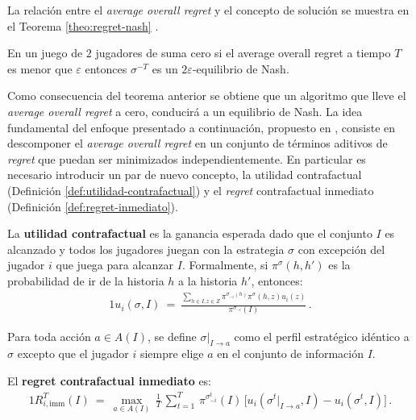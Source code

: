 La relación entre el \textit{average overall regret} y el concepto de solución se muestra en el Teorema \ref{theo:regret-nash} \cite{bib:cfr}.
\begin{theorem}
\label{theo:regret-nash}
En un juego de $2$ jugadores de suma cero si el average overall regret a tiempo $T$ es menor que $\varepsilon$ entonces $\sigma^{-T}$ es un $2\varepsilon$-equilibrio de Nash.
\end{theorem}

Como consecuencia del teorema anterior se obtiene que un algoritmo que lleve el \textit{average overall regret} a cero, conducirá a un equilibrio de Nash. La idea fundamental del enfoque presentado a continuación, propuesto en \cite{bib:cfr}, consiste en descomponer el \textit{average overall regret} en un conjunto de términos aditivos de \textit{regret} que puedan ser minimizados independientemente. En particular es necesario introducir un par de nuevo concepto, la utilidad contrafactual (Definición \ref{def:utilidad-contrafactual}) y el \textit{regret} contrafactual inmediato (Definición \ref{def:regret-inmediato}).

\begin{definition}
\label{def:utilidad-contrafactual}
La \textbf{utilidad contrafactual} es la ganancia esperada dado que el conjunto $I$ es alcanzado y todos los jugadores juegan con la estrategia $\sigma$ con excepción del jugador $i$ que juega para alcanzar $I$. Formalmente, si $\pi^{\sigma}(h, h')$ es la probabilidad de ir de la historia $h$ a la historia $h'$, entonces:
\begin{alignat}{1}
u_i(\sigma, I)\ =\ \frac{\sum_{h \in I, z \in Z} \pi^{\sigma_{-i}(h)} \pi^{\sigma}(h, z) u_i(z)}{\pi^{\sigma_{-i}}(I)} \,.
\end{alignat}
\end{definition}

Para toda acción $a \in A(I)$, se define $\sigma|_{I \rightarrow a}$ como el perfil estratégico idéntico a $\sigma$ excepto que el jugador $i$ siempre elige $a$ en el conjunto de información $I$.

\begin{definition}
\label{def:regret-inmediato}
El \textbf{regret contrafactual inmediato} es:
\begin{alignat}{1}
R_{i, \text{imm}}^T(I)\ =\  \max_{a \in A(I)} \, \frac{1}{T} \, \sum_{t = 1}^T \, \pi^{\sigma_{-i}^t}(I) \, \bigl[ u_i(\sigma^t|_{I \rightarrow a}, I) - u_i(\sigma^t, I) \bigr]\,.
\end{alignat}
\end{definition}

